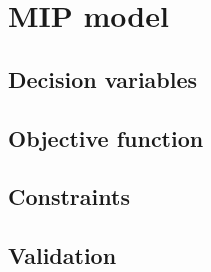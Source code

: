 \section{MIP model}


\subsection{Decision variables}


\subsection{Objective function}


\subsection{Constraints}


\subsection{Validation}